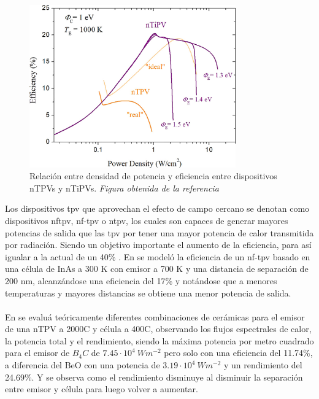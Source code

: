 \begin{figure}[H]
	\centering
		\includegraphics[height=7cm]{figuras/PowerDensityVSEfficiency_nTiPV.png}
	\caption[Relación entre densidad de potencia y eficiencia entre dispositivos nTPVs y nTiPVs]{Relación entre densidad de potencia y eficiencia entre dispositivos nTPVs y nTiPVs. \textit{Figura obtenida de la referencia \cite{thermoionic_TPV_NF}}}
	\label{fig:PowerDensityVSEfficiency_nTiPV}
\end{figure}
Los dispositivos \acrshort{tpv} que aprovechan el efecto de campo cercano se denotan como dispositivos \acrshort{nftpv}, \acrshort{nf-tpv} o \acrshort{ntpv}, los cuales son capaces de generar mayores potencias de salida que las \acrshort{tpv} por tener una mayor potencia de calor transmitida por radiación. Siendo un objetivo importante el aumento de la eficiencia, para así igualar a la actual de un 40\% \cite{thermophotovoltaic_40}. En \cite{modelEfficiency_NF_TPV} se modeló la eficiencia de un \acrshort{nf-tpv} basado en una célula de InAs a 300 K con emisor a 700 K y una distancia de separación de 200 nm, alcanzándose una eficiencia del 17\% y notándose que a menores temperaturas y mayores distancias se obtiene una menor potencia de salida.\\\\
En \cite{differentEmitterCeramics} se evaluá teóricamente diferentes combinaciones de cerámicas para el emisor de una nTPV a 2000\textdegree C y célula a 400\textdegree C, observando los flujos espectrales de calor, la potencia total y el rendimiento, siendo la máxima potencia por metro cuadrado para el emisor de $B_4C$ de $7.45\cdot 10^4 \ Wm^{-2}$ pero solo con una eficiencia del 11.74\%, a diferencia del BeO con una potencia de $3.19\cdot 10^4 \ Wm^{-2}$ y un rendimiento del 24.69\%. Y se observa como el rendimiento disminuye al disminuir la separación entre emisor y célula para luego volver a aumentar.\\\\
